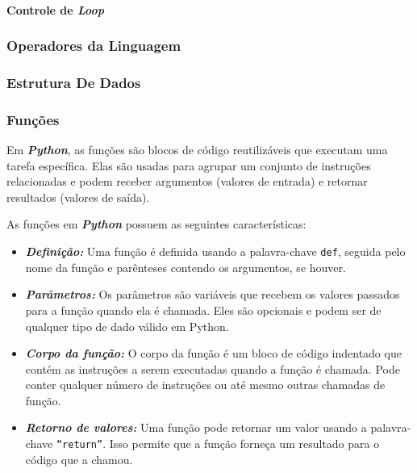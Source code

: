 \documentclass[a4paper, 12pt, onecolumn,singlespacing]{article}
\begin{document}
	\paragraph{Controle de \textit{Loop}}
	
	\subsubsection{Operadores da Linguagem}
	
	\subsubsection{Estrutura De Dados}
	
	\subsubsection{Funções}
	
	Em \textbf{\textit{Python}}, as funções são blocos de código reutilizáveis que executam uma tarefa específica. Elas são usadas para agrupar um conjunto de instruções relacionadas e podem receber argumentos (valores de entrada) e retornar resultados (valores de saída).
	
	As funções em \textbf{\textit{Python}} possuem as seguintes características:
	
	\begin{itemize}
	
	\item \textbf{\textit{Definição:}} Uma função é definida usando a palavra-chave \texttt{def}, seguida pelo nome da função e parênteses contendo os argumentos, se houver.
	
	\item \textbf{\textit{Parâmetros:}} Os parâmetros são variáveis que recebem os valores passados para a função quando ela é chamada. Eles são opcionais e podem ser de qualquer tipo de dado válido em Python.
	
	\item \textbf{\textit{Corpo da função:}} O corpo da função é um bloco de código indentado que contém as instruções a serem executadas quando a função é chamada. Pode conter qualquer número de instruções ou até mesmo outras chamadas de função.
	
	\item \textbf{\textit{Retorno de valores:}} Uma função pode retornar um valor usando a palavra-chave \texttt{``return''}. Isso permite que a função forneça um resultado para o código que a chamou.
	
	\end{itemize}
	
\end{document}
